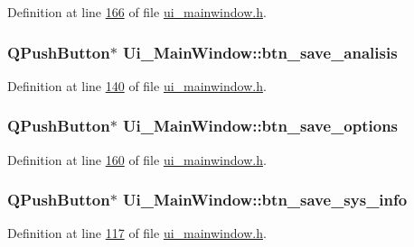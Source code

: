 Definition at line \hyperlink{a00139_source_l00166}{166} of file \hyperlink{a00139_source}{ui\+\_\+mainwindow.\+h}.

\hypertarget{a00080_a231adeaeca96ac21170495bfb1422e5e}{
\subsubsection[{btn\+\_\+save\+\_\+analisis}]{\setlength{\rightskip}{0pt plus 5cm}Q\+Push\+Button$\ast$ Ui\+\_\+\+Main\+Window\+::btn\+\_\+save\+\_\+analisis}}\label{a00080_a231adeaeca96ac21170495bfb1422e5e}


Definition at line \hyperlink{a00139_source_l00140}{140} of file \hyperlink{a00139_source}{ui\+\_\+mainwindow.\+h}.

\hypertarget{a00080_a409e5b794dbab22d7b958be406b6a030}{
\subsubsection[{btn\+\_\+save\+\_\+options}]{\setlength{\rightskip}{0pt plus 5cm}Q\+Push\+Button$\ast$ Ui\+\_\+\+Main\+Window\+::btn\+\_\+save\+\_\+options}}\label{a00080_a409e5b794dbab22d7b958be406b6a030}


Definition at line \hyperlink{a00139_source_l00160}{160} of file \hyperlink{a00139_source}{ui\+\_\+mainwindow.\+h}.

\hypertarget{a00080_a5ccef61fb3372e70d59a662f4fde5db3}{
\subsubsection[{btn\+\_\+save\+\_\+sys\+\_\+info}]{\setlength{\rightskip}{0pt plus 5cm}Q\+Push\+Button$\ast$ Ui\+\_\+\+Main\+Window\+::btn\+\_\+save\+\_\+sys\+\_\+info}}\label{a00080_a5ccef61fb3372e70d59a662f4fde5db3}


Definition at line \hyperlink{a00139_source_l00117}{117} of file \hyperlink{a00139_source}{ui\+\_\+mainwindow.\+h}.

